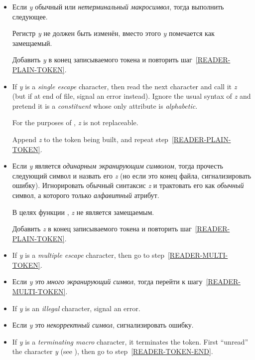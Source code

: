 \begin{enumerate}
\begin{itemize}
\item Если \emph{y} обычный или \emph{нетерминальный макросимвол},
  тогда выполнить следующее.

  Регистр \emph{y} не должен быть изменён, вместо этого \emph{y}
  помечается как замещаемый.
  
  Добавить \emph{y} в конец записываемого токена и повторить
  шаг~\ref{READER-PLAIN-TOKEN}.

\item
If \emph{y} is a \emph{single escape} character, then read the next character
and call it \emph{z}
(but if at end of file, signal an error instead).
Ignore the usual syntax of \emph{z}
and pretend it is a \emph{constituent} whose only attribute is
\emph{alphabetic}.

For the purposes of , \emph{z} is not replaceable.

Append \emph{z} to the token being built,
and repeat step~\ref{READER-PLAIN-TOKEN}.

\item Если \emph{y} является \emph{одинарным экранирующим символом},
  тогда прочесть следующий символ и назвать его \emph{z} (но если это
  конец файла, сигнализировать ошибку).  Игнорировать обычный
  синтаксис \emph{z} и трактовать его как \emph{обычный} символ, а
  которого только \emph{алфавитный} атрибут.

  В целях функции , \emph{z} не является замещаемым.

  Добавить \emph{z} в конец записываемого токена и повторить
  шаг~\ref{READER-PLAIN-TOKEN}.

\item
If \emph{y} is a \emph{multiple escape} character,
then go to step~\ref{READER-MULTI-TOKEN}.

\item Если \emph{y} это \emph{много экранирующий символ}, тогда
  перейти к шагу~\ref{READER-MULTI-TOKEN}.

\item
If \emph{y} is an \emph{illegal} character, signal an error.

\item Если \emph{y} это \emph{некорректный символ}, сигнализировать
  ошибку.

\item
If \emph{y} is a \emph{terminating macro} character, it terminates
the token.  First ``unread'' the character \emph{y}
(see ), then go to step~\ref{READER-TOKEN-END}.


\end{itemize}
\end{enumerate}
